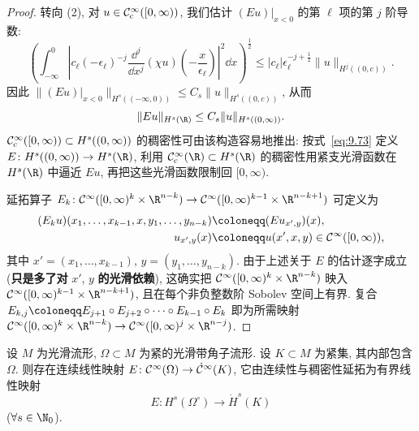\begin{proof}
转向 (2), 对 $u \in \mathcal{C}_{\mathrm{c}}^\infty([0, \infty))$, 我们估计 $(Eu)|_{x<0}$ 的第 $\ell$ 项的第 $j$ 阶导数:
\begin{equation}\label{eq:9.79}
    \left( \int_{-\infty}^{0} \left| c_\ell (-\epsilon_\ell)^{-j} \frac{\dd^j}{\dd x^j}(\chi u)\left(-\frac{x}{\epsilon_\ell}\right) \right|^2 \dd x \right)^{\frac12} \le |c_\ell| \epsilon_\ell^{-j+\frac12} \|u\|_{H^j((0,c))}.
\end{equation}
因此 $\|(Eu)|_{x<0}\|_{H^s((-\infty,0))} \le C_s \|u\|_{H^s((0,c))}$, 从而
\begin{equation}\label{eq:9.80}
    \|Eu\|_{H^s(\R)} \le C_s \|u\|_{H^s((0, \infty))}.
\end{equation}
$\mathcal{C}_{\mathrm{c}}^\infty([0, \infty)) \subset H^s((0, \infty))$ 的稠密性可由该构造容易地推出: 按式~\eqref{eq:9.73} 定义 $E \colon H^s((0, \infty)) \to H^s(\R)$, 利用 $\SmoothComp(\R) \subset H^s(\R)$ 的稠密性用紧支光滑函数在 $H^s(\R)$ 中逼近 $Eu$, 再把这些光滑函数限制回 $[0, \infty)$.

延拓算子 $E_k \colon \Smooth([0, \infty)^k \times \R^{n-k}) \to \Smooth([0, \infty)^{k-1} \times \R^{n-k+1})$ 可定义为
\begin{equation}\label{eq:9.81}
    \begin{aligned}
        (E_k u)(x_1, \ldots, x_{k-1}, x, y_1, \ldots, y_{n-k}) &\defeq (E u_{x', y})(x), \\
        u_{x', y}(x) &\defeq u(x', x, y) \in \Smooth([0, \infty)),
    \end{aligned}
\end{equation}
其中 $x' = (x_1, \ldots, x_{k-1})$, $y = (y_1, \ldots, y_{n-k})$. 由于上述关于 $E$ 的估计逐字成立 (\textbf{只是多了对} $x'$, $y$ \textbf{的光滑依赖}), 这确实把 $\Smooth([0, \infty)^k \times \R^{n-k})$ 映入 $\Smooth([0, \infty)^{k-1} \times \R^{n-k+1})$, 且在每个非负整数阶 Sobolev 空间上有界. 复合 $E_{k,j} \defeq E_{j+1} \circ E_{j+2} \circ \cdots \circ E_{k-1} \circ E_k$ 即为所需映射 $\Smooth([0, \infty)^k \times \R^{n-k}) \to \Smooth([0, \infty)^j \times \R^{n-j})$.
\end{proof}

\begin{corollary}\label{cor:9.26}
设 $M$ 为光滑流形, $\Omega \subset M$ 为紧的光滑带角子流形. 设 $K \subset M$ 为紧集, 其内部包含 $\Omega$. 则存在连续线性映射 $E \colon \mathcal{C}^\infty(\Omega) \to \dot{\mathcal{C}}^\infty(K)$, 它由连续性与稠密性延拓为有界线性映射
\begin{equation}\label{eq:9.82}
    E \colon H^s(\Omega^\circ) \to \dot{H}^s(K)
\end{equation}
($\forall s \in \N_0$).
\end{corollary}

